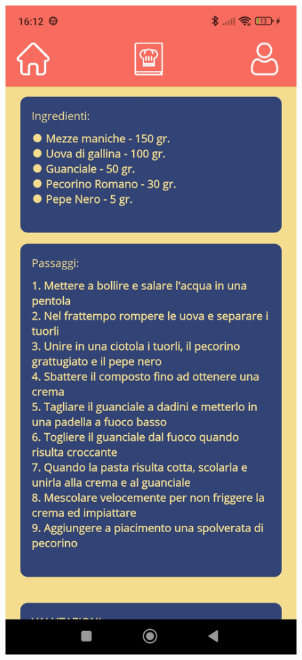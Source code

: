 ﻿\documentclass[a4paper,12pt]{report}
\begin{document}
\begin{figure}[h!]
    \begin{minipage}{.5\textwidth}
        \centering
        \includegraphics[width=0.9\linewidth]{app_images/RecipePage2.jpg}
    \end{minipage}
\end{figure}
\end{document}
